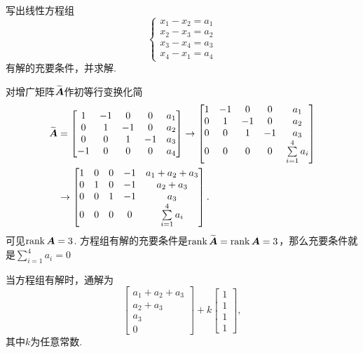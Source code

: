 \begin{example}
写出线性方程组\[
\left\{ \begin{array}{l}
x_1 - x_2 = a_1 \\
x_2 - x_3 = a_2 \\
x_3 - x_4 = a_3 \\
x_4 - x_1 = a_4
\end{array} \right.
\]有解的充要条件，并求解.
\begin{solution}
对增广矩阵\(\widetilde{\boldsymbol{A}}\)作初等行变换化简\begin{align*}
\widetilde{\boldsymbol{A}}
&= \begin{bmatrix}
1 & -1 & 0 & 0 & a_1 \\
0 & 1 & -1 & 0 & a_2 \\
0 & 0 & 1 & -1 & a_3 \\
-1 & 0 & 0 & 0 & a_4
\end{bmatrix} \to \begin{bmatrix}
1 & -1 & 0 & 0 & a_1 \\
0 & 1 & -1 & 0 & a_2 \\
0 & 0 & 1 & -1 & a_3 \\
0 & 0 & 0 & 0 & \sum\limits_{i=1}^4 a_i
\end{bmatrix} \\
&\to \begin{bmatrix}
1 & 0 & 0 & -1 & a_1 + a_2 + a_3 \\
0 & 1 & 0 & -1 & a_2 + a_3 \\
0 & 0 & 1 & -1 & a_3 \\
0 & 0 & 0 & 0 & \sum\limits_{i=1}^4 a_i
\end{bmatrix}.
\end{align*}
可见\(\rank\boldsymbol{A} = 3\).
方程组有解的充要条件是\(\rank\widetilde{\boldsymbol{A}} = \rank\boldsymbol{A} = 3\)，那么充要条件就是\(\sum\limits_{i=1}^4 a_i = 0\)

当方程组有解时，通解为\[
\begin{bmatrix}
a_1 + a_2 + a_3 \\ a_2 + a_3 \\ a_3 \\ 0
\end{bmatrix} + k \begin{bmatrix}
1 \\ 1 \\ 1 \\ 1
\end{bmatrix},
\]其中\(k\)为任意常数.
\end{solution}
\end{example}

